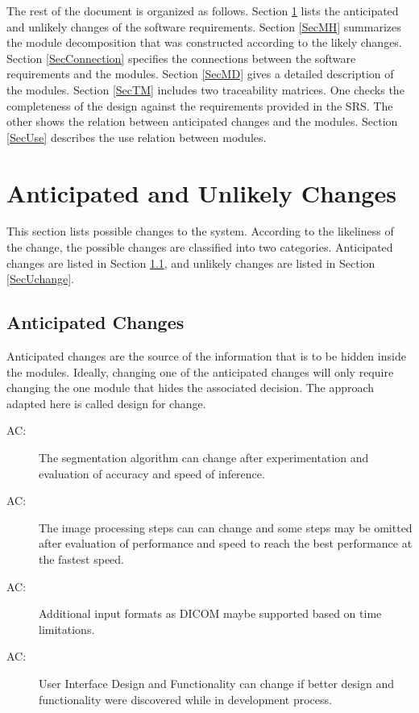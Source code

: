 \documentclass[12pt, titlepage]{article}
\newcounter{acnum}
\newcommand{\actheacnum}{AC\theacnum}
\begin{document}
The rest of the document is organized as follows. Section
\ref{SecChange} lists the anticipated and unlikely changes of the software
requirements. Section \ref{SecMH} summarizes the module decomposition that
was constructed according to the likely changes. Section \ref{SecConnection}
specifies the connections between the software requirements and the
modules. Section \ref{SecMD} gives a detailed description of the
modules. Section \ref{SecTM} includes two traceability matrices. One checks
the completeness of the design against the requirements provided in the SRS. The
other shows the relation between anticipated changes and the modules. Section
\ref{SecUse} describes the use relation between modules.

\section{Anticipated and Unlikely Changes} \label{SecChange}

This section lists possible changes to the system. According to the likeliness
of the change, the possible changes are classified into two
categories. Anticipated changes are listed in Section \ref{SecAchange}, and
unlikely changes are listed in Section \ref{SecUchange}.

\subsection{Anticipated Changes} \label{SecAchange}

Anticipated changes are the source of the information that is to be hidden
inside the modules. Ideally, changing one of the anticipated changes will only
require changing the one module that hides the associated decision. The approach
adapted here is called design for
change.

\begin{description}
  \item[ \actheacnum \label{acSeg}:] The segmentation algorithm
        can change after experimentation and evaluation of accuracy and speed of inference.
  \item[ \actheacnum \label{acProc}:] The image processing steps can
        can change and some steps may be omitted after evaluation of performance and speed to
        reach the best performance at the fastest speed.
  \item[ \actheacnum \label{acInputFormat}:] Additional input formats as DICOM
        maybe supported based on time limitations.
  \item[ \actheacnum \label{acUI}:] User Interface Design and Functionality can change
        if better design and functionality were discovered while in development process.
\end{description}
\end{document}
